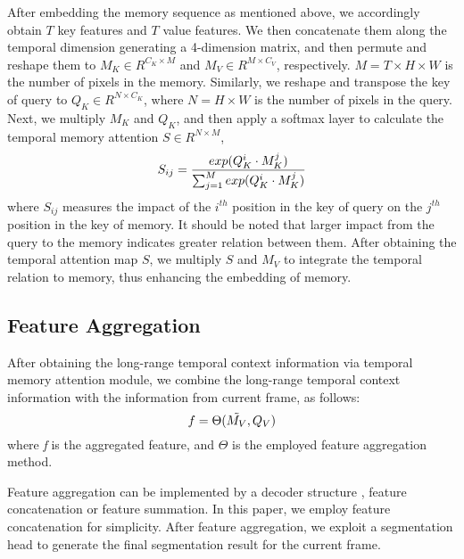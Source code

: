 \documentclass{article}
\begin{document}
	After embedding the memory sequence as mentioned above, we accordingly obtain $T$ key features and $T$ value features. 
	We then concatenate them along the temporal dimension generating a 4-dimension matrix, and then permute and reshape them to $M_K\in R^{C_K \times M}$ and $M_V\in R^{M \times C_V}$, respectively.  
$M = T \times H \times W$ is the number of pixels in the memory.
Similarly, we reshape and transpose the key of query to $Q_K\in R^{N \times C_K}$, where $N = H \times W$ is the number of pixels in the query.
Next, we multiply $M_K$ and $Q_K$, and then apply a softmax layer to calculate the temporal memory attention $S\in R^{N\times M}$,
	\vspace{-0.2cm}
	\begin{equation}
		S_{ij}=\frac{exp(Q_K^i \cdot M_K^j)}{\sum_{j=1}^{M}exp(Q_K^i \cdot M_K^j)} \label{Softmax}
		\vspace{-0.2cm}
	\end{equation}
	where $S_{ij}$ measures the impact of the $i^{th}$ position in the key of query on the $j^{th}$ position in the key of memory.  
	It should be noted that larger impact from the query to the memory indicates greater relation between them.
	After obtaining the temporal attention map $S$, we multiply $S$ and $M_V$ to integrate the temporal relation to memory, thus enhancing the embedding of memory.
	
	\subsection{Feature Aggregation}
	
	After obtaining the long-range temporal context information via temporal memory attention module, 
we combine the long-range temporal context information with the information from current frame, as follows:
	\vspace{-0.2cm}
	\begin{equation}
f=\Theta (\tilde{M_V}, Q_V)
		\vspace{-0.2cm}
	\end{equation}
	where \textit{f} is the aggregated feature, and \textit{$\Theta$} is the employed feature aggregation method.


	Feature aggregation can be implemented by a decoder structure \cite{deeplabv3+2018} , feature concatenation or feature summation. In this paper, we employ feature concatenation for simplicity. After feature aggregation, we exploit a segmentation head to generate the final segmentation result for the current frame.
	
\end{document}
